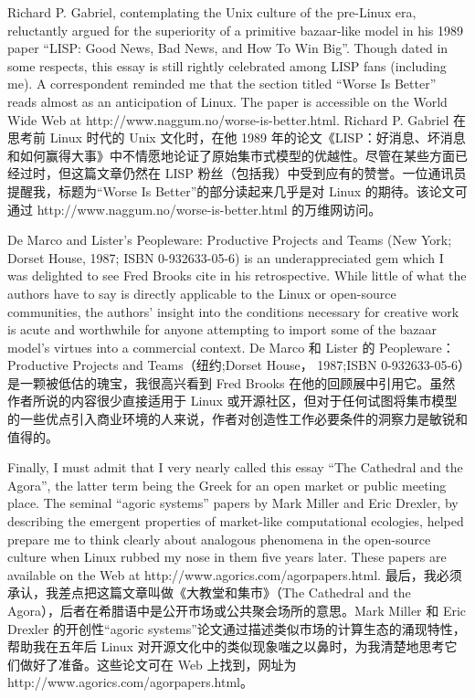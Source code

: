 \documentclass[a4paper,12pt,UTF8,twoside]{ctexbook}
\begin{document}
Richard P. Gabriel, contemplating the Unix culture of the pre-Linux era, reluctantly argued for the superiority of a primitive bazaar-like model in his 1989 paper ``LISP: Good News, Bad News, and How To Win Big''. Though dated in some respects, this essay is still rightly celebrated among LISP fans (including me). A correspondent reminded me that the section titled ``Worse Is Better'' reads almost as an anticipation of Linux. The paper is accessible on the World Wide Web at http://www.naggum.no/worse-is-better.html.
Richard P. Gabriel 在思考前 Linux 时代的 Unix 文化时，在他 1989 年的论文《LISP：好消息、坏消息和如何赢得大事》中不情愿地论证了原始集市式模型的优越性。尽管在某些方面已经过时，但这篇文章仍然在 LISP 粉丝（包括我）中受到应有的赞誉。一位通讯员提醒我，标题为“Worse Is Better”的部分读起来几乎是对 Linux 的期待。该论文可通过 http://www.naggum.no/worse-is-better.html 的万维网访问。

De Marco and Lister's Peopleware: Productive Projects and Teams (New York; Dorset House, 1987; ISBN 0-932633-05-6) is an underappreciated gem which I was delighted to see Fred Brooks cite in his retrospective. While little of what the authors have to say is directly applicable to the Linux or open-source communities, the authors' insight into the conditions necessary for creative work is acute and worthwhile for anyone attempting to import some of the bazaar model's virtues into a commercial context.
De Marco 和 Lister 的 Peopleware： Productive Projects and Teams（纽约;Dorset House， 1987;ISBN 0-932633-05-6）是一颗被低估的瑰宝，我很高兴看到 Fred Brooks 在他的回顾展中引用它。虽然作者所说的内容很少直接适用于 Linux 或开源社区，但对于任何试图将集市模型的一些优点引入商业环境的人来说，作者对创造性工作必要条件的洞察力是敏锐和值得的。

Finally, I must admit that I very nearly called this essay ``The Cathedral and the Agora'', the latter term being the Greek for an open market or public meeting place. The seminal ``agoric systems'' papers by Mark Miller and Eric Drexler, by describing the emergent properties of market-like computational ecologies, helped prepare me to think clearly about analogous phenomena in the open-source culture when Linux rubbed my nose in them five years later. These papers are available on the Web at http://www.agorics.com/agorpapers.html.
最后，我必须承认，我差点把这篇文章叫做《大教堂和集市》（The Cathedral and the Agora），后者在希腊语中是公开市场或公共聚会场所的意思。Mark Miller 和 Eric Drexler 的开创性“agoric systems”论文通过描述类似市场的计算生态的涌现特性，帮助我在五年后 Linux 对开源文化中的类似现象嗤之以鼻时，为我清楚地思考它们做好了准备。这些论文可在 Web 上找到，网址为 http://www.agorics.com/agorpapers.html。
\end{document}

